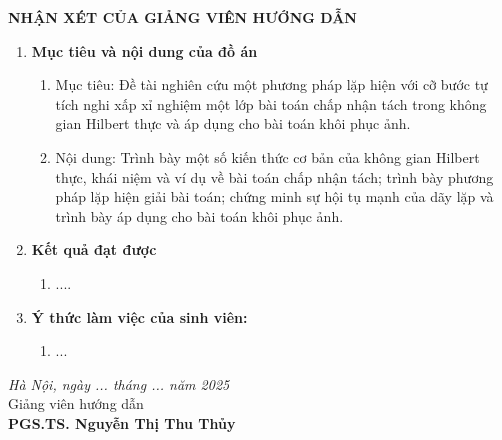 \thisfancypage{
	\setlength{\fboxsep}{0.5cm}
	\fbox}{}
 
\fontsize{13pt}{16pt}\selectfont
\bigbreak
\begin{center}
	{\bf NHẬN XÉT CỦA GIẢNG VIÊN HƯỚNG DẪN}
\end{center}

\fontsize{12pt}{14pt}\selectfont
\begin{enumerate}
 \item [{\bf 1.}]{\bf Mục tiêu và nội dung của đồ án}
 \begin{enumerate}
 \item Mục tiêu: Đề tài nghiên cứu một phương pháp lặp hiện với cỡ bước tự tích nghi xấp xỉ nghiệm một lớp bài toán chấp nhận tách trong không gian Hilbert thực và áp dụng cho bài toán khôi phục ảnh.
 \item Nội dung: Trình bày một số kiến thức cơ bản của không gian Hilbert thực, khái niệm và ví dụ về bài toán chấp nhận tách; trình bày phương pháp lặp hiện giải bài toán; chứng minh sự hội tụ mạnh của dãy lặp và trình bày áp dụng cho bài toán khôi phục ảnh.
 \end{enumerate}
    
\item [{\bf 2.}] {\bf Kết quả đạt được} 
 \begin{enumerate}
\item ....
\end{enumerate}
\item [{\bf 3.}]{\bf Ý thức làm việc của sinh viên:}
\begin{enumerate}
\item ...
\end{enumerate}
\end{enumerate}

\vspace{5mm}
\hspace{0.5\textwidth}
\begin{minipage}{0.5\textwidth}
\noindent\begin{center}
\textit{Hà Nội, ngày ... tháng ...  năm 2025} \\
Giảng viên hướng dẫn\\ \vspace{0.6cm}
\vspace{1.5cm}
\textbf{PGS.TS. Nguyễn Thị Thu Thủy}
\end{center}	
\end{minipage}
\restoregeometry

\newpage
